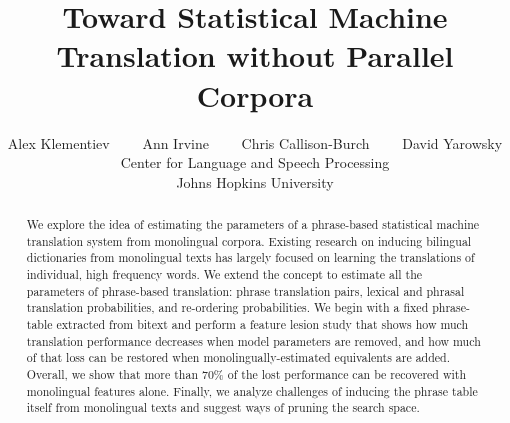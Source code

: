 \documentclass[11pt]{article}
\title{Toward Statistical Machine Translation without Parallel Corpora}
\author{}
\author{Alex Klementiev \ \ \ \  Ann Irvine \ \ \ \ Chris Callison-Burch \ \ \ \ David Yarowsky \\
Center for Language and Speech Processing \\ Johns Hopkins University}
\date{}
\begin{document}
\maketitle
\begin{abstract}
We explore the idea of estimating the parameters of a phrase-based statistical machine translation system from monolingual corpora.  Existing research on inducing bilingual dictionaries from monolingual texts has largely focused on learning the translations of individual, high frequency words.   We extend the concept to estimate all the parameters of phrase-based translation: phrase translation pairs, lexical and phrasal translation probabilities, and re-ordering probabilities.  We begin with a fixed phrase-table extracted from bitext and perform a feature lesion study that shows how much translation performance decreases when model parameters are removed, and how much of that loss can be restored when monolingually-estimated equivalents are added.  Overall, we show that more than 70\% of the lost performance can be recovered with monolingual features alone.  Finally, we analyze challenges of inducing the phrase table itself from monolingual texts and suggest ways of pruning the search space.  



\end{abstract}
\end{document}

